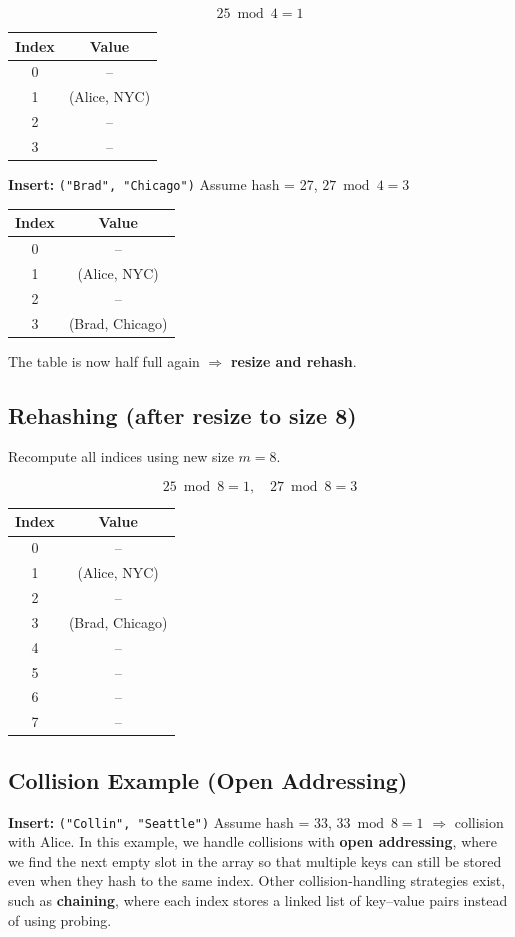 \documentclass{article}
\begin{document}
\[
25 \bmod 4 = 1
\]

\begin{center}
\begin{tabular}{c c}
\toprule
Index & Value \\
\midrule
0 & -- \\
1 & (Alice, NYC) \\
2 & -- \\
3 & -- \\
\bottomrule
\end{tabular}
\end{center}

\textbf{Insert:} \texttt{("Brad", "Chicago")}  
Assume hash = 27, $27 \bmod 4 = 3$

\begin{center}
\begin{tabular}{c c}
\toprule
Index & Value \\
\midrule
0 & -- \\
1 & (Alice, NYC) \\
2 & -- \\
3 & (Brad, Chicago) \\
\bottomrule
\end{tabular}
\end{center}

The table is now half full again $\Rightarrow$ \textbf{resize and rehash}.  

\subsection{Rehashing (after resize to size 8)}
Recompute all indices using new size $m = 8$.

\[
25 \bmod 8 = 1,\quad 27 \bmod 8 = 3
\]

\begin{center}
\begin{tabular}{c c}
\toprule
Index & Value \\
\midrule
0 & -- \\
1 & (Alice, NYC) \\
2 & -- \\
3 & (Brad, Chicago) \\
4 & -- \\
5 & -- \\
6 & -- \\
7 & -- \\
\bottomrule
\end{tabular}
\end{center}

\subsection{Collision Example (Open Addressing)}
\textbf{Insert:} \texttt{("Collin", "Seattle")}  
Assume hash = 33, $33 \bmod 8 = 1$ $\Rightarrow$ collision with Alice. In this example, we handle collisions with \textbf{open addressing}, where we find the next empty slot in the array so that multiple keys can still be stored even when they hash to the same index. Other collision-handling strategies exist, such as \textbf{chaining}, where each index stores a linked list of key–value pairs instead of using probing.
\end{document}

